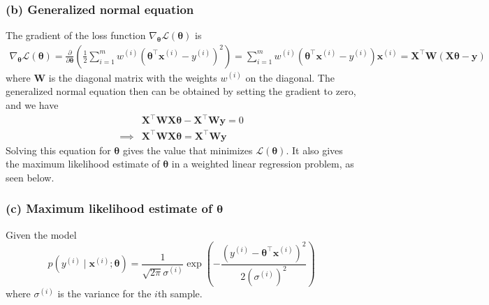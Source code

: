 \clearpage
\subsubsection*{(b) Generalized normal equation}

The gradient of the loss function \( \nabla_{\boldsymbol{\theta}} \mathcal{L}(\boldsymbol{\theta}) \) is
\begin{align*}
    \nabla_{\boldsymbol{\theta}} \mathcal{L}(\boldsymbol{\theta})
    =
    \frac{\partial}{\partial \boldsymbol{\theta}}
    \left(
    \frac{1}{2}
    \sum_{i=1}^{m}
    w^{(i)} {\left(\boldsymbol{\theta}^\top \mathbf{x}^{(i)}-y^{(i)}\right)}^{2}
    \right)
    =
    \sum_{i=1}^{m}
    w^{(i)} \left(\boldsymbol{\theta}^\top \mathbf{x}^{(i)}-y^{(i)}\right) \mathbf{x}^{(i)}
    =
    \mathbf{X}^\top \mathbf{W} (\mathbf{X} \boldsymbol{\theta} - \mathbf{y})
\end{align*}
where \( \mathbf{W} \) is the diagonal matrix with the weights \( w^{(i)} \) on the diagonal.
The generalized normal equation then can be obtained by setting the gradient to zero, and we have
\begin{align*}
     &
    \mathbf{X}^\top \mathbf{W} \mathbf{X} \boldsymbol{\theta} - \mathbf{X}^\top \mathbf{W} \mathbf{y}
    =
    0
    \\
    \implies
     &
    \boxed{
        \mathbf{X}^\top \mathbf{W} \mathbf{X} \boldsymbol{\theta}
        =
        \mathbf{X}^\top \mathbf{W} \mathbf{y}
    }
\end{align*}
Solving this equation for \( \boldsymbol{\theta} \) gives the value that minimizes \( \mathcal{L}(\boldsymbol{\theta}) \).
It also gives the maximum likelihood estimate of \( \boldsymbol{\theta} \) in a weighted linear regression problem, as seen below.

\subsubsection*{(c) Maximum likelihood estimate of \( \boldsymbol{\theta} \)}

Given the model
\begin{equation*}
    p\left(y^{(i)} \mid \mathbf{x}^{(i)} ; \boldsymbol{\theta}\right)=\frac{1}{\sqrt{2 \pi} \sigma^{(i)}} \exp \left(-\frac{{\left(y^{(i)}-\boldsymbol{\theta}^{\top} \mathbf{x}^{(i)}\right)}^{2}}{2{\left(\sigma^{(i)}\right)}^{2}}\right)
\end{equation*}
where \( \sigma^{(i)} \) is the variance for the \( i \)th sample.

